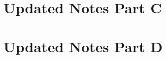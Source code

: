 \documentclass[%
	,graybox
	,envcountsect			%
	]{svmono}
\begin{document}
\chapter{Updated Notes  Part C}
	
\chapter{Updated Notes Part D}
	
	
	
	

\backmatter

\cleardoublepage 

{\RaggedRight
{}
}

\end{document}
